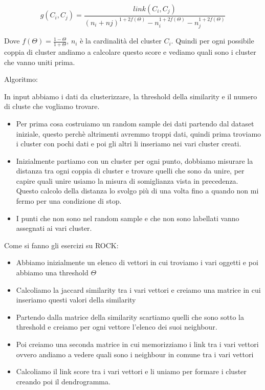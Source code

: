 \documentclass[14pt]{extreport}
\begin{document}
\begin{equation}
    g(C_i,C_j) = \frac{link(C_i,C_j)}{(n_i + nj)^{1+2f(\Theta)}-n_i^{1+2f(\Theta)}-n_j^{1+2f(\Theta)}}
\end{equation}

Dove $f(\Theta) = \frac{1-\Theta}{1+\Theta}$, $n_i$ è la cardinalità del cluster $C_i$.
Quindi per ogni possibile coppia di cluster andiamo a calcolare questo score e vediamo quali sono i cluster che vanno uniti prima.

Algoritmo:

In input abbiamo i dati da clusterizzare, la threshold della similarity e il numero di cluste che vogliamo trovare.

\begin{itemize}
    \item Per prima cosa costruiamo un random sample dei dati partendo dal dataset iniziale, questo perchè altrimenti avremmo troppi dati, quindi prima troviamo i cluster con pochi dati e poi gli altri li inseriamo nei vari cluster creati.
    \item Inizialmente partiamo con un cluster per ogni punto, dobbiamo misurare la distanza tra ogni coppia di cluster e trovare quelli che sono da unire, per capire quali unire usiamo la misura di somiglianza vista in precedenza.
    Questo calcolo della distanza lo svolgo più di una volta fino a quando non mi fermo per una condizione di stop.
    \item I punti che non sono nel random sample e che non sono labellati vanno assegnati ai vari cluster.
\end{itemize}

Come si fanno gli esercizi su ROCK:

\begin{itemize}
    \item Abbiamo inizialmente un elenco di vettori in cui troviamo i vari oggetti e poi abbiamo una threshold $\Theta$
    \item Calcoliamo la jaccard similarity tra i vari vettori e creiamo una matrice in cui inseriamo questi valori della similarity
    \item Partendo dalla matrice della similarity scartiamo quelli che sono sotto la threshold e creiamo per ogni vettore l'elenco dei suoi neighbour.
    \item Poi creiamo una seconda matrice in cui memorizziamo i link tra i vari vettori ovvero andiamo a vedere quali sono i neighbour in comune tra i vari vettori
    \item Calcoliamo il link score tra i vari vettori e li uniamo per formare i cluster creando poi il dendrogramma.
\end{itemize}
\end{document}
